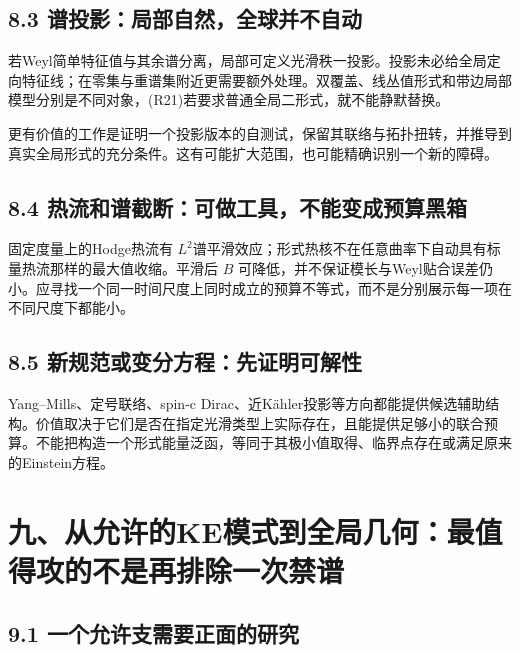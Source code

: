 \documentclass[
  11pt,
  a4paper,
  fontset=none]{ctexart}
\begin{document}
\subsection{8.3
谱投影：局部自然，全球并不自动}\label{ux8c31ux6295ux5f71ux5c40ux90e8ux81eaux7136ux5168ux7403ux5e76ux4e0dux81eaux52a8}

若Weyl简单特征值与其余谱分离，局部可定义光滑秩一投影。投影未必给全局定向特征线；在零集与重谱集附近更需要额外处理。双覆盖、线丛值形式和带边局部模型分别是不同对象，(R21)若要求普通全局二形式，就不能静默替换。

更有价值的工作是证明一个投影版本的自测试，保留其联络与拓扑扭转，并推导到真实全局形式的充分条件。这有可能扩大范围，也可能精确识别一个新的障碍。

\subsection{8.4
热流和谱截断：可做工具，不能变成预算黑箱}\label{ux70edux6d41ux548cux8c31ux622aux65adux53efux505aux5de5ux5177ux4e0dux80fdux53d8ux6210ux9884ux7b97ux9ed1ux7bb1}

固定度量上的Hodge热流有
\(L^2\)谱平滑效应；形式热核不在任意曲率下自动具有标量热流那样的最大值收缩。平滑后
\(B\)
可降低，并不保证模长与Weyl贴合误差仍小。应寻找一个同一时间尺度上同时成立的预算不等式，而不是分别展示每一项在不同尺度下都能小。

\subsection{8.5
新规范或变分方程：先证明可解性}\label{ux65b0ux89c4ux8303ux6216ux53d8ux5206ux65b9ux7a0bux5148ux8bc1ux660eux53efux89e3ux6027}

Yang--Mills、定号联络、spin-c
Dirac、近Kähler投影等方向都能提供候选辅助结构。价值取决于它们是否在指定光滑类型上实际存在，且能提供足够小的联合预算。不能把构造一个形式能量泛函，等同于其极小值取得、临界点存在或满足原来的Einstein方程。

\section{九、从允许的KE模式到全局几何：最值得攻的不是再排除一次禁谱}\label{ux4e5dux4eceux5141ux8bb8ux7684keux6a21ux5f0fux5230ux5168ux5c40ux51e0ux4f55ux6700ux503cux5f97ux653bux7684ux4e0dux662fux518dux6392ux9664ux4e00ux6b21ux7981ux8c31}

\subsection{9.1
一个允许支需要正面的研究}\label{ux4e00ux4e2aux5141ux8bb8ux652fux9700ux8981ux6b63ux9762ux7684ux7814ux7a76}
\end{document}
